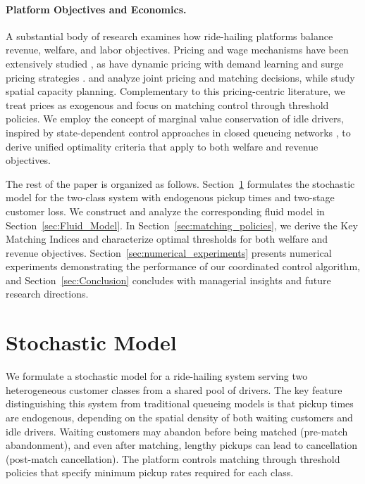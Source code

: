 \paragraph{Platform Objectives and Economics.}
A substantial body of research examines how ride-hailing platforms balance revenue, welfare, and labor objectives.
Pricing and wage mechanisms have been extensively studied \citep{Taylor2018, Benjaafar2022, CHEN2022108329, hu2020price}, as have dynamic pricing with demand learning \citep{DenBoer2014, KeskinZeevi2014, BesbesZeevi2015} and surge pricing strategies \citep{CuiOrhunDuenyas2022, yan2020dynamic}.
\citet{OZKAN20201149} and \citet{BanerjeeRiquelmeJohari2015} analyze joint pricing and matching decisions, while \citet{BanerjeeFreundLykouris2022, IglesiasRossiZhangPavone2019, GurvichLariviereMoreno2019} study spatial capacity planning.
Complementary to this pricing-centric literature, we treat prices as exogenous and focus on matching control through threshold policies.
We employ the concept of marginal value conservation of idle drivers, inspired by state-dependent control approaches in closed queueing networks \citep{BanerjeeKanoriaQian2018, PowellSchultz2004}, to derive unified optimality criteria that apply to both welfare and revenue objectives.


The rest of the paper is organized as follows.
Section~\ref{sec:Stochastic_Model} formulates the stochastic model for the two-class system with endogenous pickup times and two-stage customer loss.
We construct and analyze the corresponding fluid model in Section~\ref{sec:Fluid_Model}.
In Section~\ref{sec:matching_policies}, we derive the Key Matching Indices and characterize optimal thresholds for both welfare and revenue objectives.
Section~\ref{sec:numerical_experiments} presents numerical experiments demonstrating the performance of our coordinated control algorithm, and Section~\ref{sec:Conclusion} concludes with managerial insights and future research directions.

\section{Stochastic Model}\label{sec:Stochastic_Model}

We formulate a stochastic model for a ride-hailing system serving two heterogeneous customer classes from a shared pool of drivers.
The key feature distinguishing this system from traditional queueing models is that pickup times are endogenous, depending on the spatial density of both waiting customers and idle drivers.
Waiting customers may abandon before being matched (pre-match abandonment), and even after matching, lengthy pickups can lead to cancellation (post-match cancellation).
The platform controls matching through threshold policies that specify minimum pickup rates required for each class.

